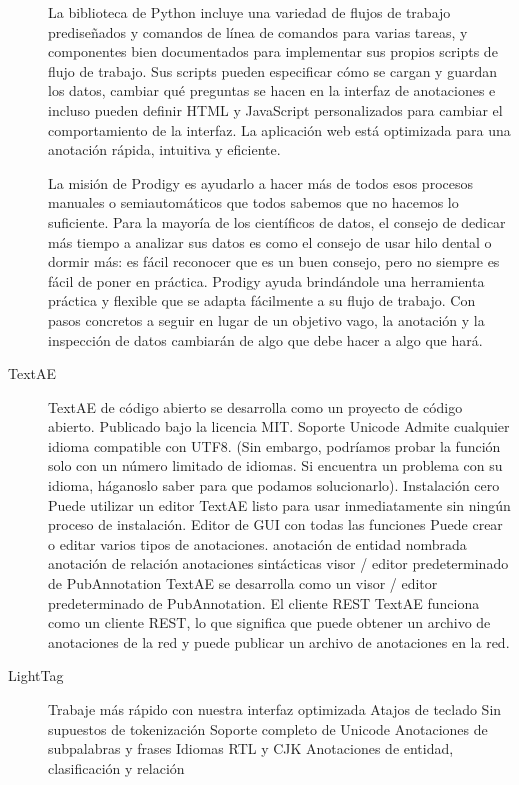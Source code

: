 \begin{description}
La biblioteca de Python incluye una variedad de flujos de trabajo prediseñados y comandos de línea de comandos para varias tareas, y componentes bien documentados para implementar sus propios scripts de flujo de trabajo. Sus scripts pueden especificar cómo se cargan y guardan los datos, cambiar qué preguntas se hacen en la interfaz de anotaciones e incluso pueden definir HTML y JavaScript personalizados para cambiar el comportamiento de la interfaz. La aplicación web está optimizada para una anotación rápida, intuitiva y eficiente.

La misión de Prodigy es ayudarlo a hacer más de todos esos procesos manuales o semiautomáticos que todos sabemos que no hacemos lo suficiente. Para la mayoría de los científicos de datos, el consejo de dedicar más tiempo a analizar sus datos es como el consejo de usar hilo dental o dormir más: es fácil reconocer que es un buen consejo, pero no siempre es fácil de poner en práctica. Prodigy ayuda brindándole una herramienta práctica y flexible que se adapta fácilmente a su flujo de trabajo. Con pasos concretos a seguir en lugar de un objetivo vago, la anotación y la inspección de datos cambiarán de algo que debe hacer a algo que hará.

\item[TextAE]

TextAE de código abierto se desarrolla como un proyecto de código abierto. Publicado bajo la licencia MIT. Soporte Unicode Admite cualquier idioma compatible con UTF8. (Sin embargo, podríamos probar la función solo con un número limitado de idiomas. Si encuentra un problema con su idioma, háganoslo saber para que podamos solucionarlo). Instalación cero
Puede utilizar un editor TextAE listo para usar inmediatamente sin ningún proceso de instalación.
Editor de GUI con todas las funciones
Puede crear o editar varios tipos de anotaciones. anotación de entidad nombrada anotación de relación anotaciones sintácticas visor / editor predeterminado de PubAnnotation TextAE se desarrolla como un visor / editor predeterminado de PubAnnotation.
El cliente REST TextAE funciona como un cliente REST, lo que significa que puede obtener un archivo de anotaciones de la red y puede publicar un archivo de anotaciones en la red.

\item[LightTag]

Trabaje más rápido con nuestra interfaz optimizada
Atajos de teclado
Sin supuestos de tokenización
Soporte completo de Unicode
Anotaciones de subpalabras y frases
Idiomas RTL y CJK
Anotaciones de entidad, clasificación y relación


\end{description}
